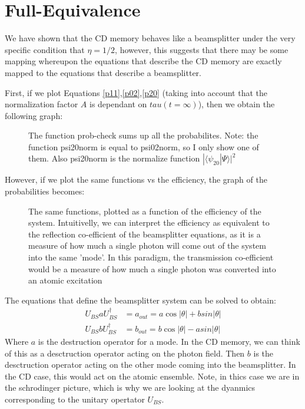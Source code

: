 \documentclass[12pt]{article}
\begin{document}
\section{Full-Equivalence}
We have shown that the CD memory behaves like a beamsplitter under the very specific condition that $\eta = 1/2$, however, this suggests that there may be some mapping whereupon the equations that describe the CD memory are exactly mapped to the equations that describe a beamsplitter. 

First, if we plot Equations \eqref{p11},\eqref{p02},\eqref{p20} (taking into account that the normalization factor $A$ is dependant on $tau(t=\infty)$), then we obtain the following graph:
\begin{figure}[H]
\caption{The function prob-check sums up all the probabilites. Note: the function psi20norm is equal to psi02norm, so I only show one of them. Also psi20norm is the normalize function $|\langle \psi_20 | \Psi \rangle|^2$}

\end{figure}

However, if we plot the same functions vs the efficiency, the graph of the probabilities becomes:
\begin{figure}[H]
\caption{The same functions, plotted as a function of the efficiency of the system. Intuitivelly, we can interpret the efficiency as equivalent to the reflection co-efficient of the beamsplitter equations, as it is a measure of how much a single photon will come out of the system into the same 'mode'. In this paradigm, the transmission co-efficient would be a measure of how much a single photon was converted into an atomic excitation}

\end{figure}

The equations that define the beamsplitter system can be solved to obtain:
\begin{align}
U_{BS} a U^\dagger_{BS} &= a_{out}= a \cos  |\theta| + b sin| \theta|\\
U_{BS} b U^\dagger_{BS} &= b_{out}=b \cos  |\theta| - a sin| \theta|
\end{align}
Where $a$ is the destruction operator for a mode. In the CD memory, we can think of this as a desctruction operator acting on the photon field. Then $b$ is the desctruction operator acting on the other mode coming into the beamsplitter. In the CD case, this would act on the atomic ensemble. Note, in thics case we are in the schrodinger picture, which is why we are looking at the dyanmics corresponding to the unitary opertator $U_{BS}$.
\end{document}
